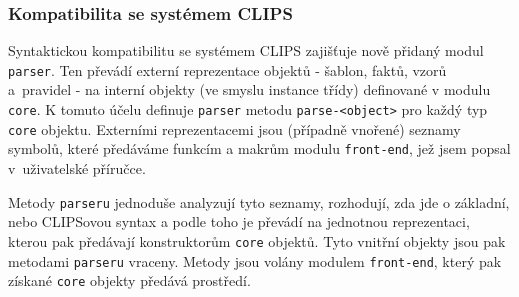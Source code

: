 \subsubsection{Kompatibilita se systémem CLIPS}
Syntaktickou kompatibilitu se systémem CLIPS zajišťuje nově přidaný modul
\verb|parser|. Ten převádí externí reprezentace objektů - šablon, faktů, vzorů
a~pravidel - na interní objekty (ve smyslu instance třídy) definované v modulu
\verb|core|. K tomuto účelu definuje \verb|parser| metodu \verb|parse-<object>|
pro každý typ \verb|core| objektu. Externími reprezentacemi jsou (případně
vnořené) seznamy symbolů, které předáváme funkcím a makrům modulu
\verb|front-end|, jež jsem popsal v~uživatelské příručce.

Metody \verb|parseru| jednoduše analyzují tyto seznamy, rozhodují, zda jde o
základní, nebo CLIPSovou syntax a podle toho je převádí na jednotnou
reprezentaci, kterou pak předávají konstruktorům \verb|core| objektů. Tyto
vnitřní objekty jsou pak metodami \verb|parseru| vraceny. Metody jsou volány
modulem \verb|front-end|, který pak získané \verb|core| objekty předává
prostředí.
